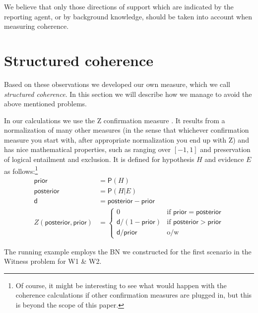 \documentclass[10pt,]{scrartcl}
\newcommand{\pr}{\mathsf{P}}
\newcommand{\s}[1]{\mbox{\textsf{#1}}}
\begin{document}
We believe that only those directions of support which are indicated by
the reporting agent, or by background knowledge, should be taken into
account when measuring coherence.


\section{Structured coherence}\label{sec:structured}


Based on these observations we developed our own measure, which we call
\textit{structured coherence}. In this section we will describe how we
manage to avoid the above mentioned problems.  


In our calculations we use the \s{Z} confirmation measure \citep[see][for a detailed study and defense]{crupi2007BayesianMeasuresEvidential}. It results from a
normalization of many other measures (in the sense that whichever
confirmation measure you start with, after appropriate normalization you
end up with \s{Z}) and has nice mathematical properties, such as ranging
over \([-1,1]\) and preservation of logical entailment and exclusion. It
is defined for hypothesis \(H\) and evidence \(E\) as follows:\footnote{Of course, it might be interesting to see what would happen
with the coherence calculations if other confirmation measures are
plugged in, but this is beyond the scope of this paper.}
\begin{align*}
   \mathsf{prior} & = \pr(H) \\
   \mathsf{posterior} & = \pr(H \vert E)\\
   \mathsf{d} & = \mathsf{posterior} - \mathsf{prior} \\
       Z(\mathsf{posterior,prior}) & =  \begin{cases}
       0 & \text{if } \mathsf{prior} = \mathsf{posterior}\\
       \mathsf{d}/(1-\mathsf{prior}) & \text{if } \mathsf{posterior} > \mathsf{prior} \\
         \mathsf{d}/\mathsf{prior} & \text{o/w} 
       \end{cases}
   \end{align*}



 The running example employs the BN we
constructed for the first scenario in the \textsf{Witness} problem for \textsf{W1} \& \textsf{W2}.
\end{document}
